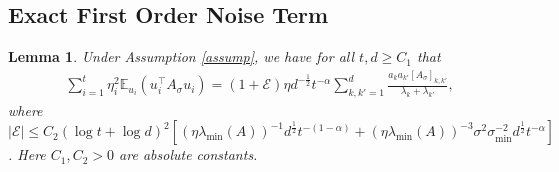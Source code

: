 \documentclass[11pt, reqno,english]{amsart}
\newtheorem{lemma}{Lemma}[section]
\begin{document}
\subsection{Exact First Order Noise Term} 
\begin{lemma}\label{variance-sigma-term}
Under Assumption \ref{assump}, we have for all $t, d \geq C_1$ that
\begin{align*}
\sum_{i = 1}^t \eta_i^2 \mathbb{E}_{u_i}(u_i^\top A_{\sigma} u_i) = (1+\mathcal E)\eta d^{-\frac{1}{2}}t^{-\alpha}\sum_{k,k' = 1}^d \frac{a_k a_{k'}[A_{\sigma}]_{k,k'}}{\lambda_{k} + \lambda_{k'}},
\end{align*}
where $|\mathcal E| \leq C_2(\log t + \log d)^2 [(\eta \lambda_{\min}(A))^{-1}d^{\frac{1}{2}}t^{-(1-\alpha)} + (\eta\lambda_{\min}(A))^{-3}\sigma^2\sigma^{-2}_{\min}d^{\frac{1}{2}}t^{-\alpha}]$. Here $C_1, C_2 > 0$ are absolute constants.
\end{lemma}
\end{document}
